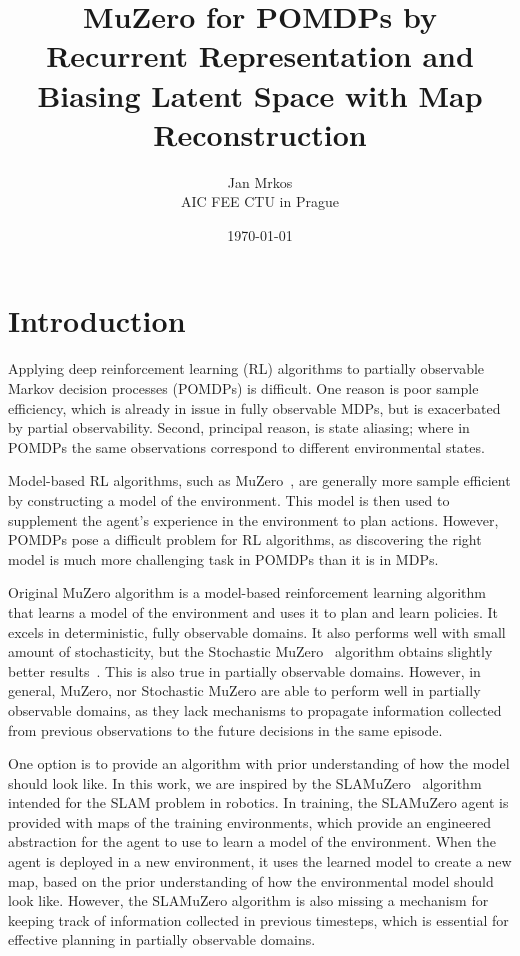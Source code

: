 \documentclass[12pt]{article}
\title{MuZero for POMDPs by Recurrent Representation and Biasing Latent Space with Map Reconstruction}
\author{Jan Mrkos\\ AIC FEE CTU in Prague\\}
\date{\today}
\begin{document}
\maketitle
\section{Introduction}

Applying deep reinforcement learning (RL) algorithms to partially observable Markov decision processes (POMDPs) is difficult. 
One reason is poor sample efficiency, which is  already in issue in fully observable MDPs, but is exacerbated by partial observability. 
Second, principal reason, is state aliasing; where in POMDPs the same observations correspond to different environmental states.  

Model-based RL algorithms, such as MuZero~\cite{schrittwieserMasteringAtariGo2020}, are generally more sample efficient by constructing a model of the environment. 
This model is then used to supplement the agent's experience in the environment to plan actions. 
However, POMDPs pose a difficult problem for RL algorithms, as discovering the right model is much more challenging task in POMDPs than it is in MDPs. 

Original MuZero algorithm is a model-based reinforcement learning algorithm that learns a model of the environment and uses it to plan and learn policies. 
It excels in deterministic, fully observable domains.
It also performs well with small amount of stochasticity, but the Stochastic MuZero~\cite{antonoglouPlanningStochasticEnvironments2021} algorithm obtains slightly better results~\cite{niuLightZeroUnifiedBenchmark2023}. 
This is also true in partially observable domains.
However, in general, MuZero, nor Stochastic MuZero are able to perform well in partially observable domains, as they lack mechanisms to propagate information collected from previous observations to the future decisions in the same episode. 

One option is to provide an algorithm with prior understanding of how the model should look like.
In this work, we are inspired by the SLAMuZero~\cite{fangSLAMuZeroPlanLearn2024} algorithm intended for the SLAM problem in robotics. 
In training, the SLAMuZero agent is provided with maps of the training environments, which provide an engineered abstraction for the agent to use to learn a model of the environment.
When the agent is deployed in a new environment, it uses the learned model to create a new map, based on the prior understanding of how the environmental model should look like.
However, the SLAMuZero algorithm is also missing a mechanism for keeping track of information collected in previous timesteps, which is essential for effective planning in partially observable domains.
\end{document}
